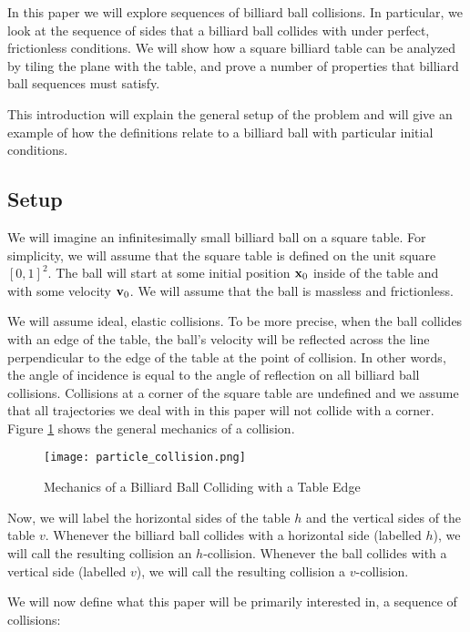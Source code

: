 In this paper we will explore sequences of billiard ball collisions. In particular, we look at the sequence of sides that a billiard ball collides with under perfect, frictionless conditions. We will show how a square billiard table can be analyzed by tiling the plane with the table, and prove a number of properties that billiard ball sequences must satisfy.

This introduction will explain the general setup of the problem and will give an example of how the definitions relate to a billiard ball with particular initial conditions.

\subsection{Setup}

We will imagine an infinitesimally small billiard ball on a square table. For simplicity, we will assume that the square table is defined on the unit square $[0,1]^2$. The ball will start at some initial position $\mathbf{x}_0$ inside of the table and with some velocity $\mathbf{v}_0$. We will assume that the ball is massless and frictionless.

We will assume ideal, elastic collisions. To be more precise, when the ball collides with an edge of the table, the ball's velocity will be reflected across the line perpendicular to the edge of the table at the point of collision. In other words, the angle of incidence is equal to the angle of reflection on all billiard ball collisions. Collisions at a corner of the square table are undefined and we assume that all trajectories we deal with in this paper will not collide with a corner. Figure \ref{fig:collision-angle} shows the general mechanics of a collision.

\begin{figure}
  \texttt{[image: particle\_collision.png]}
  \caption{\label{fig:collision-angle}Mechanics of a Billiard Ball Colliding with a Table Edge}
\end{figure}

Now, we will label the horizontal sides of the table $h$ and the vertical sides of the table $v$. Whenever the billiard ball collides with a horizontal side (labelled $h$), we will call the resulting collision an $h$-collision. Whenever the ball collides with a vertical side (labelled $v$), we will call the resulting collision a $v$-collision.

We will now define what this paper will be primarily interested in, a sequence of collisions:


